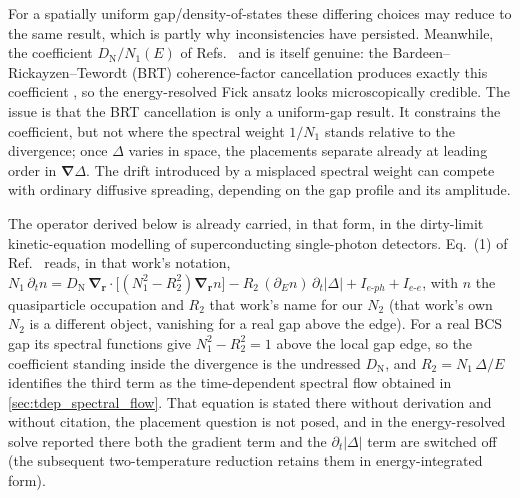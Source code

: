 \documentclass[
  aps,
  prb,
  preprint,
  superscriptaddress,
  longbibliography,
  nofootinbib
]{revtex4-2}
\newcommand{\br}{\mathbf{r}}
\newcommand{\bnabla}{\boldsymbol{\nabla}}
\newcommand{\DOS}{N_1}
\newcommand{\DN}{D_{\mathrm{N}}}
\begin{document}
For a spatially uniform gap/density-of-states these differing choices may reduce to the same result, which is partly why inconsistencies have persisted. 
Meanwhile, the coefficient \(\DN/\DOS(E)\) of
Refs.~ and  is itself
genuine: the Bardeen--Rickayzen--Tewordt (BRT) coherence-factor
cancellation produces exactly this coefficient
\cite{bardeen1959}, so the energy-resolved Fick ansatz looks
microscopically credible. The issue is that the BRT cancellation is only a
uniform-gap result. It constrains the coefficient, but not where
the spectral weight \(1/\DOS\) stands relative to the divergence; once \(\Delta\) varies in space, the placements separate already at
leading order in \(\bnabla\Delta\). The drift introduced by a misplaced spectral weight can compete with
ordinary diffusive spreading, depending on the gap profile and its amplitude.

The operator derived below is already carried, in that form, in the
dirty-limit kinetic-equation modelling of superconducting single-photon
detectors. Eq.~(1) of
Ref.~ reads, in that work's notation,
\(\DOS\,\partial_t n=\DN\,\bnabla_{\br}\cdot\bigl[(\DOS^{2}-R_2^{2})\bnabla_{\br}n\bigr]-R_2\,(\partial_E n)\,\partial_t|\Delta|+I_{e\text{-}ph}+I_{e\text{-}e}\),
with \(n\) the quasiparticle occupation and \(R_2\) that work's name for
our \(N_2\) (that work's own \(N_2\) is a different object, vanishing for
a real gap above the edge). For a real BCS gap its spectral functions give
\(\DOS^{2}-R_2^{2}=1\) above the local gap edge, so the coefficient
standing inside the divergence is the undressed \(\DN\), and
\(R_2=\DOS\,\Delta/E\) identifies the third term as the time-dependent
spectral flow obtained in \cref{sec:tdep_spectral_flow}. That equation is
stated there without derivation and without citation, the placement
question is not posed, and in the energy-resolved solve reported there both
the gradient term and the \(\partial_t|\Delta|\) term are switched off (the
subsequent two-temperature reduction retains them in energy-integrated form).
\end{document}
